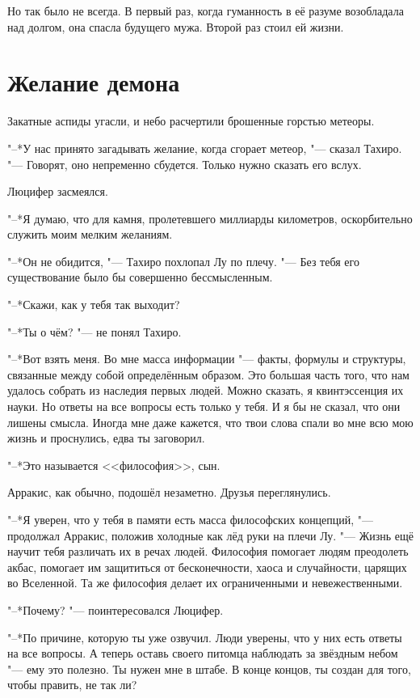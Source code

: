 \documentclass[a4paper,10pt,fleqn]{book}
\begin{document}
Но так было не всегда.
В первый раз, когда гуманность в её разуме возобладала над долгом, она спасла будущего мужа.
Второй раз стоил ей жизни.

\section{Желание демона}

Закатные аспиды угасли, и небо расчертили брошенные горстью метеоры.

"--*У нас принято загадывать желание, когда сгорает метеор, "--- сказал Тахиро.
"--- Говорят, оно непременно сбудется.
Только нужно сказать его вслух.

Люцифер засмеялся.

"--*Я думаю, что для камня, пролетевшего миллиарды километров, оскорбительно служить моим мелким желаниям.

"--*Он не обидится, "--- Тахиро похлопал Лу по плечу.
"--- Без тебя его существование было бы совершенно бессмысленным.

"--*Скажи, как у тебя так выходит?

"--*Ты о чём? "--- не понял Тахиро.

"--*Вот взять меня.
Во мне масса информации "--- факты, формулы и структуры, связанные между собой определённым образом.
Это большая часть того, что нам удалось собрать из наследия первых людей.
Можно сказать, я квинтэссенция их науки.
Но ответы на все вопросы есть только у тебя.
И я бы не сказал, что они лишены смысла.
Иногда мне даже кажется, что твои слова спали во мне всю мою жизнь и проснулись, едва ты заговорил.

"--*Это называется <<философия>>, сын.

Арракис, как обычно, подошёл незаметно.
Друзья переглянулись.

"--*Я уверен, что у тебя в памяти есть масса философских концепций, "--- продолжал Арракис, положив холодные как лёд руки на плечи Лу.
"--- Жизнь ещё научит тебя различать их в речах людей.
Философия помогает людям преодолеть акбас, помогает им защититься от бесконечности, хаоса и случайности, царящих во Вселенной.
Та же философия делает их ограниченными и невежественными.

"--*Почему? "--- поинтересовался Люцифер.

"--*По причине, которую ты уже озвучил.
Люди уверены, что у них есть ответы на все вопросы.
А теперь оставь своего питомца наблюдать за звёздным небом "--- ему это полезно.
Ты нужен мне в штабе.
В конце концов, ты создан для того, чтобы править, не так ли?
\end{document}
